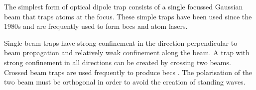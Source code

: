 The simplest form of optical dipole trap consists of a single focussed Gaussian beam that traps atoms at the focus. These simple traps have been used since the 1980s\cite{chu_experimental_1986} and are frequently used to form \glspl{bec} and atom lasers\cite{chikkatur_continuous_2002, kleine_buning_slow_2010, lin_rapid_2009}.

Single beam traps have strong confinement in the direction perpendicular to beam propagation and relatively weak confinement along the beam. A trap with strong confinement in all directions can be created by crossing two beams. Crossed beam traps are used frequently to produce \glspl{bec} \cite{couvert_quasi-monomode_2008, arnold_all-optical_2011, fu_bose-einstein_2011, barrett_all-optical_2001, xiong_evaporative_2010}. The polarisation of the two beam must be orthogonal in order to avoid the creation of standing waves.\label{odt_polarisation}

